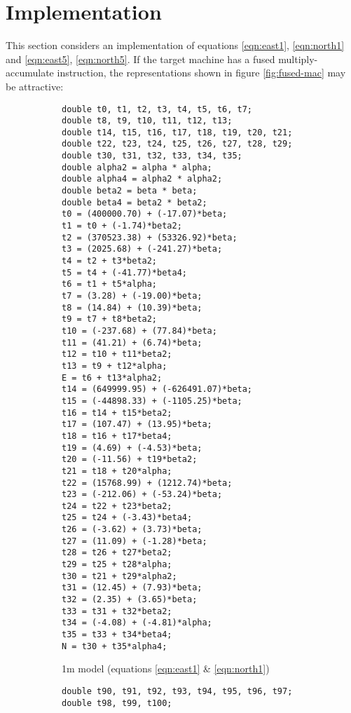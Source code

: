 \documentclass[10pt,a4paper]{article}
\begin{document}
\section {Implementation}
\label{sec:implementation}
This section considers an implementation of equations \eqref{eqn:east1},
\eqref{eqn:north1} and \eqref{eqn:east5}, \eqref{eqn:north5}.  If the target
machine has a fused multiply-accumulate instruction, the representations shown
in figure \ref{fig:fused-mac} may be attractive:

\begin{figure}[htb]

  \hrulefill

  \begin{subfigure}[b]{0.45\textwidth}
\footnotesize
\begin{verbatim}
double t0, t1, t2, t3, t4, t5, t6, t7;
double t8, t9, t10, t11, t12, t13;
double t14, t15, t16, t17, t18, t19, t20, t21;
double t22, t23, t24, t25, t26, t27, t28, t29;
double t30, t31, t32, t33, t34, t35;
double alpha2 = alpha * alpha;
double alpha4 = alpha2 * alpha2;
double beta2 = beta * beta;
double beta4 = beta2 * beta2;
t0 = (400000.70) + (-17.07)*beta;
t1 = t0 + (-1.74)*beta2;
t2 = (370523.38) + (53326.92)*beta;
t3 = (2025.68) + (-241.27)*beta;
t4 = t2 + t3*beta2;
t5 = t4 + (-41.77)*beta4;
t6 = t1 + t5*alpha;
t7 = (3.28) + (-19.00)*beta;
t8 = (14.84) + (10.39)*beta;
t9 = t7 + t8*beta2;
t10 = (-237.68) + (77.84)*beta;
t11 = (41.21) + (6.74)*beta;
t12 = t10 + t11*beta2;
t13 = t9 + t12*alpha;
E = t6 + t13*alpha2;
t14 = (649999.95) + (-626491.07)*beta;
t15 = (-44898.33) + (-1105.25)*beta;
t16 = t14 + t15*beta2;
t17 = (107.47) + (13.95)*beta;
t18 = t16 + t17*beta4;
t19 = (4.69) + (-4.53)*beta;
t20 = (-11.56) + t19*beta2;
t21 = t18 + t20*alpha;
t22 = (15768.99) + (1212.74)*beta;
t23 = (-212.06) + (-53.24)*beta;
t24 = t22 + t23*beta2;
t25 = t24 + (-3.43)*beta4;
t26 = (-3.62) + (3.73)*beta;
t27 = (11.09) + (-1.28)*beta;
t28 = t26 + t27*beta2;
t29 = t25 + t28*alpha;
t30 = t21 + t29*alpha2;
t31 = (12.45) + (7.93)*beta;
t32 = (2.35) + (3.65)*beta;
t33 = t31 + t32*beta2;
t34 = (-4.08) + (-4.81)*alpha;
t35 = t33 + t34*beta4;
N = t30 + t35*alpha4;
\end{verbatim}
\caption{1m model (equations \eqref{eqn:east1} \& \eqref{eqn:north1})}
\end{subfigure}
  \begin{subfigure}[b]{0.45\textwidth}
    \footnotesize
    \begin{verbatim}
double t90, t91, t92, t93, t94, t95, t96, t97;
double t98, t99, t100;

\end{verbatim}
\end{subfigure}
\end{figure}
\end{document}
